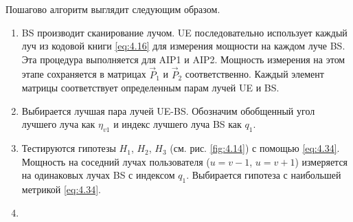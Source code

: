 Пошагово алгоритм выглядит следующим образом. 
\begin{enumerate}[label=\textbf{Шаг \arabic*:}]
    \item BS производит сканирование лучом. UE последовательно использует
    каждый луч из кодовой книги \eqref{eq:4.16} для измерения мощности на каждом луче BS.
    Эта процедура выполняется для AIP1 и AIP2. Мощность измерения на этом этапе сохраняется в
    матрицах $\vec P_1$ и $\vec P_2$ соответственно. Каждый элемент матрицы соответствует
    определенным парам лучей UE и BS.
    \item Выбирается лучшая пара лучей UE-BS. Обозначим обобщенный угол лучшего луча как $\eta_{v1}$ и индекс лучшего луча BS как 
    $q_1$. 
    \item Тестируются гипотезы $H_1$, $H_2$, $H_3$ (см. рис. \ref{fig:4.14}) с помощью \eqref{eq:4.34}. Мощность на соседний лучах пользователя 
    ($u=v-1$, $u=v+1$) измеряется на одинаковых лучах BS с индексом $q_1$. Выбирается гипотеза с наибольшей метрикой \eqref{eq:4.34}.
    \item 
\end{enumerate}



